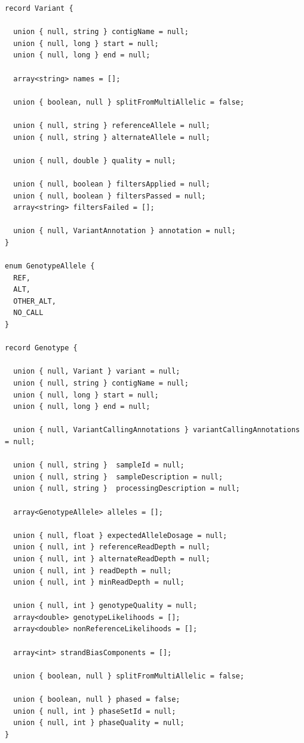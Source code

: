 \documentclass[phd]{ucbthesis}
\begin{document}
\begin{lstlisting}[caption=\textsc{ADAM} core variant and genotype schemas]
record Variant {

  union { null, string } contigName = null;
  union { null, long } start = null;
  union { null, long } end = null;

  array<string> names = [];

  union { boolean, null } splitFromMultiAllelic = false;

  union { null, string } referenceAllele = null;
  union { null, string } alternateAllele = null;

  union { null, double } quality = null;

  union { null, boolean } filtersApplied = null;
  union { null, boolean } filtersPassed = null;
  array<string> filtersFailed = [];

  union { null, VariantAnnotation } annotation = null;
}

enum GenotypeAllele {
  REF,
  ALT,
  OTHER_ALT,
  NO_CALL
}

record Genotype {

  union { null, Variant } variant = null;
  union { null, string } contigName = null;
  union { null, long } start = null;
  union { null, long } end = null;

  union { null, VariantCallingAnnotations } variantCallingAnnotations = null;

  union { null, string }  sampleId = null;
  union { null, string }  sampleDescription = null;
  union { null, string }  processingDescription = null;

  array<GenotypeAllele> alleles = [];

  union { null, float } expectedAlleleDosage = null;
  union { null, int } referenceReadDepth = null;
  union { null, int } alternateReadDepth = null;
  union { null, int } readDepth = null;
  union { null, int } minReadDepth = null;

  union { null, int } genotypeQuality = null;
  array<double> genotypeLikelihoods = [];
  array<double> nonReferenceLikelihoods = [];

  array<int> strandBiasComponents = [];

  union { boolean, null } splitFromMultiAllelic = false;

  union { boolean, null } phased = false;
  union { null, int } phaseSetId = null;
  union { null, int } phaseQuality = null;
}
\end{lstlisting}
\end{document}
